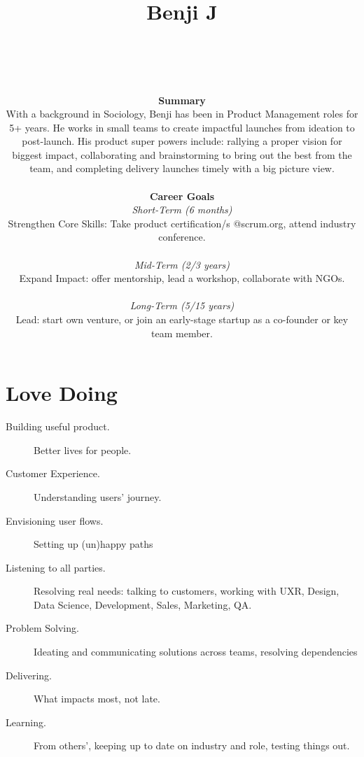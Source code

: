 \documentclass[10pt, a4paper, twocolumn]{article}
\title{Benji J} %
\author{
	\authorstyle{Product Manager %
	[SaaS,
	Music,
	Crypto---%
	Blockchain---%
	Web3%
	]
	} \\ \\
	\noindent\fbox{%
    \parbox{\textwidth}{%
\textbf{This Document Goal}
is to better understand:
1) what I have to offer, how the market sees me;
2) opportunities I haven’t considered; and
3) connect with people you think I should talk with. \\ \\
\textbf{Candidate-Market Fit} \\ \textit{%
Seeking a remote \textbf{Product Manager} role with attention to UX at early stage (Series A, Pre-IPO/ICO) \textbf{Crypto} B2C company with emphasis one these areas:
social impact,
real life assets,
music and media industries. \\
\#crypto
\#IP-rights
\#real-world-assets
\#B2C
\#B2B2C
\#music
\#streaming
\#NFTs
\#AI
}
    }%
}
\\ \\
%
\textbf{Summary} \\
With a background in Sociology, Benji has been in Product Management roles for 5+ years.
He works in small teams to create impactful launches from ideation to post-launch.
His product super powers include:
rallying a proper vision for biggest impact,
collaborating and brainstorming to bring out the best from the team,
and completing delivery launches timely with a big picture view.
\\ \\
\textbf{Career Goals} \\ %
\textit{Short-Term (6 months)} \\
Strengthen Core Skills:
Take product certification/s @scrum.org, attend industry conference.
\\ \\ %
  \textit{Mid-Term (2/3 years)} \\
Expand Impact: offer mentorship, lead a workshop, collaborate with NGOs.
\\ \\ %
\textit{Long-Term (5/15 years)} \\
Lead:
start own venture, or join an early-stage startup as a co-founder or key team member.
%
}
\date{ }
\begin{document}
% 
%
\maketitle %
\thispagestyle{firstpage} %
%
%
%
\section*{Love Doing}

\begin{description}
\item[Building useful product.] Better lives for people. %
\item[Customer Experience.]
Understanding users' journey.
\item[Envisioning user flows.] Setting up (un)happy paths
\item[Listening to all parties.] Resolving real needs: %
talking to customers,
working with UXR,
Design,
Data Science,
Development,
Sales,
Marketing,
QA.
\item[Problem Solving.]%
Ideating and communicating solutions across teams, resolving dependencies
\item[Delivering.] What impacts most, not late.
\item[Learning.]
From others', %
keeping up to date on industry and role, testing things out.
\end{description}
\end{document}

